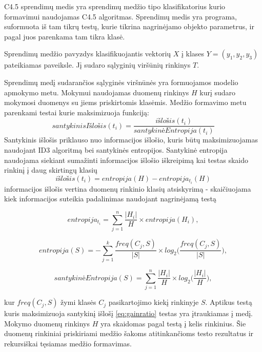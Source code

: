 C4.5 sprendimų medis yra sprendimų medžio tipo klasifikatorius kurio formavimui naudojamas C4.5 algoritmas.
Sprendimų medis yra programa, suformuota iš tam tikrų testų, kurie tikrina nagrinėjamo objekto parametrus,
ir pagal juos parenkama tam tikra klasė.


Sprendimų medžio pavyzdys klasifikuojantis vektorių $X$ į klases $Y = (y_1, y_2, y_3)$ pateikiamas
  paveiksle. Jį sudaro sąlyginių viršūnių rinkinys $T$.

Sprendimų medį sudarančios sąlyginės viršnūnės yra formuojamos modelio apmokymo metu. Mokymui naudojamas duomenų
rinkinys $H$ kurį sudaro mokymosi duomenys su jiems priskirtomis klasėmis. Medžio formavimo metu
parenkami testai kurie maksimizuoja funkciją:
\begin{equation} \label{eq:gainratio}
    santykinisIšlošis(t_i) = \frac{išlošis(t_i)}{santykinėEntropija(t_i)}
\end{equation}
Santykinis išlošis priklauso nuo informacijos išlošio, kuris būtų maksimizuojamas naudojant ID3
algoritmą bei santykinės entropijos. Santykinė entropija naudojama siekiant sumažinti informacijos
išlošio iškreipimą kai testas skaido rinkinį į daug skirtingų klasių \cite{c45}
\begin{equation}
    išlošis(t_i) = entropija(H) - entropija_{t_i}(H)
\end{equation}
informacijos išlošis vertina duomenų rinkinio klasių atsiskyrimą - skaičiuojama kiek informacijos
suteikia padalinimas naudojant nagrinėjamą testą

\begin{equation}
    entropija_{t_i} = \sum_{j=1}^{n} \frac{|H_i|}{H} \times entropija(H_i),
\end{equation}

\begin{equation}
    entropija(S) = - \sum_{j=1}^{k} \frac{freq(C_j, S)}{|S|} \times log_2 \big( \frac{freq(C_j, S)}{|S|} \big),
\end{equation}

\begin{equation}
    santykinėEntropija(S) =  \sum_{j=1}^{n} \frac{|H_i|}{H} \times log_2 \big( \frac{|H_i|}{H} \big),
\end{equation}

kur $freq(C_j, S)$ žymi klasės $C_j$ pasikartojimo kiekį rinkinyje $S$.
Aptikus testą kuris maksimizuoja santykinį išlošį \ref{eq:gainratio} testas yra įtraukiamas į medį.
Mokymo duomenų rinkinys $H$ yra skaidomas pagal testą į kelis rinkinius\cite{c45}. Šie duomenų
rinkiniai priskiriami medžio šakoms atitinkančioms testo rezultatus ir rekursiškai tęsiamas medžio formavimas.

